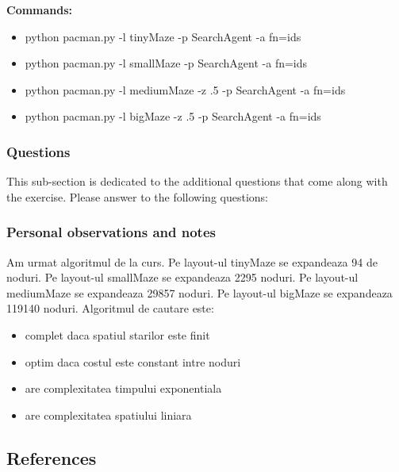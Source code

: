 \textbf{Commands:}
\begin{itemize}
    \setlength\itemsep{0em}
\item python pacman.py -l tinyMaze -p SearchAgent -a fn=ids
\item python pacman.py -l smallMaze -p SearchAgent -a fn=ids
    \item  python pacman.py -l mediumMaze -z .5 -p SearchAgent -a fn=ids
\item python pacman.py -l bigMaze -z .5 -p SearchAgent -a fn=ids%
        
\end{itemize}

\subsubsection{Questions}
This sub-section is dedicated to the additional questions that come along with the exercise. Please answer to the following questions:\newline


\subsubsection{Personal observations and notes}
Am urmat algoritmul de la curs.\newline
Pe layout-ul tinyMaze se expandeaza 94 de noduri. \newline
Pe layout-ul smallMaze se expandeaza 2295 noduri. \newline
Pe layout-ul mediumMaze se expandeaza 29857 noduri. \newline
Pe layout-ul bigMaze se expandeaza 119140 noduri. \newline \newline
Algoritmul de cautare este: 
\begin{itemize}
\item  complet daca spatiul starilor este finit
\end{itemize}
\begin{itemize}
\item  optim daca costul este constant intre noduri
\item are complexitatea timpului exponentiala 
\item are complexitatea spatiului liniara
\end{itemize}


\vspace{0.75cm}

\subsection{References}

